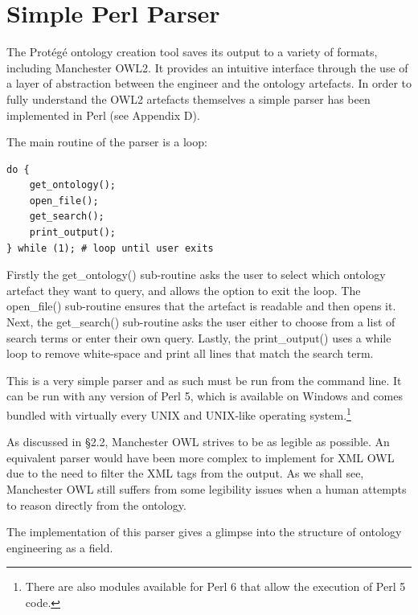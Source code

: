 \documentclass[titlepage,a4paper,12pt,oneside]{book}
\begin{document}
\section{Simple Perl Parser}
The Protégé ontology creation tool saves its output to a variety of formats, including Manchester OWL2.
It provides an intuitive interface through the use of a layer of abstraction between the engineer and the ontology artefacts.
In order to fully understand the OWL2 artefacts themselves a simple parser has been implemented in Perl (see Appendix D).\par
The main routine of the parser is a loop:
\begin{lstlisting}
do {
	get_ontology();
	open_file();
	get_search();
	print_output();
} while (1); # loop until user exits
\end{lstlisting}
Firstly the get\_ontology() sub-routine asks the user to select which ontology artefact they want to query, and allows the option to exit the loop.
The open\_file() sub-routine ensures that the artefact is readable and then opens it.
Next, the get\_search() sub-routine asks the user either to choose from a list of search terms or enter their own query.
Lastly, the print\_output() uses a while loop to remove white-space and print all lines that match the search term.\par
This is a very simple parser and as such must be run from the command line.
It can be run with any version of Perl 5, which is available on Windows and comes bundled with virtually every UNIX and UNIX-like operating system.\footnote{There are also modules available for Perl 6 that allow the execution of Perl 5 code.}\par
As discussed in §2.2, Manchester OWL strives to be as legible as possible.
An equivalent parser would have been more complex to implement for XML OWL due to the need to filter the XML tags from the output.
As we shall see, Manchester OWL still suffers from some legibility issues when a human attempts to reason directly from the ontology.\par
The implementation of this parser gives a glimpse into the structure of ontology engineering as a field.
\end{document}
